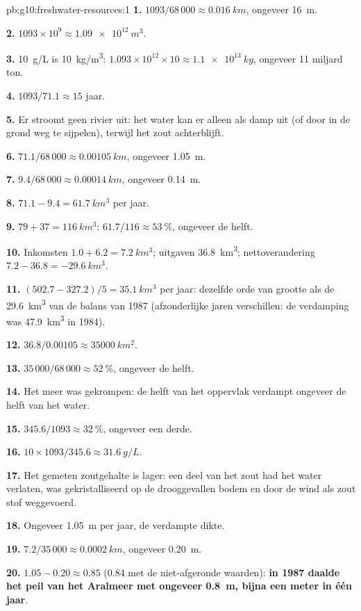 \begin{solution}{pb:g10:freshwater-resources:1}
\textbf{1.} $1093/68\,000 \approx \qty{0.016}{km}$, ongeveer \qty{16}{m}.

\textbf{2.} $1093 \times 10^9 \approx \qty{1.09e12}{m^3}$.

\textbf{3.} \qty{10}{g/L} is \qty{10}{kg/m^3}: $1.093 \times 10^{12} \times 10
\approx \qty{1.1e13}{kg}$, ongeveer \num{11} miljard ton.

\textbf{4.} $1093/71.1 \approx 15$ jaar.

\textbf{5.} Er stroomt geen rivier uit: het water kan er alleen als damp uit
(of door in de grond weg te sijpelen), terwijl het zout achterblijft.

\textbf{6.} $71.1/68\,000 \approx \qty{0.00105}{km}$, ongeveer \qty{1.05}{m}.

\textbf{7.} $9.4/68\,000 \approx \qty{0.00014}{km}$, ongeveer \qty{0.14}{m}.

\textbf{8.} $71.1 - 9.4 = \qty{61.7}{km^3}$ per jaar.

\textbf{9.} $79 + 37 = \qty{116}{km^3}$: $61.7/116 \approx \qty{53}{\percent}$,
ongeveer de helft.

\textbf{10.} Inkomsten $1.0 + 6.2 = \qty{7.2}{km^3}$; uitgaven \qty{36.8}{km^3};
nettoverandering $7.2 - 36.8 = \qty{-29.6}{km^3}$.

\textbf{11.} $(502.7 - 327.2)/5 = \qty{35.1}{km^3}$ per jaar: dezelfde orde van
grootte als de \qty{29.6}{km^3} van de balans van 1987 (afzonderlijke jaren
verschillen: de verdamping was \qty{47.9}{km^3} in 1984).

\textbf{12.} $36.8/0.00105 \approx \qty{35000}{km^2}$.

\textbf{13.} $35\,000/68\,000 \approx \qty{52}{\percent}$, ongeveer de helft.

\textbf{14.} Het meer was gekrompen: de helft van het oppervlak verdampt ongeveer
de helft van het water.

\textbf{15.} $345.6/1093 \approx \qty{32}{\percent}$, ongeveer een derde.

\textbf{16.} $10 \times 1093/345.6 \approx \qty{31.6}{g/L}$.

\textbf{17.} Het gemeten zoutgehalte is lager: een deel van het zout had het water
verlaten, was gekristalliseerd op de drooggevallen bodem en door de wind als zout
stof weggevoerd.

\textbf{18.} Ongeveer \qty{1.05}{m} per jaar, de verdampte dikte.

\textbf{19.} $7.2/35\,000 \approx \qty{0.0002}{km}$, ongeveer \qty{0.20}{m}.

\textbf{20.} $1.05 - 0.20 \approx 0.85$ (\num{0.84} met de niet-afgeronde waarden):
\textbf{in 1987 daalde het peil van het Aralmeer met ongeveer \qty{0.8}{m}, bijna
een meter in één jaar}.
\end{solution}
